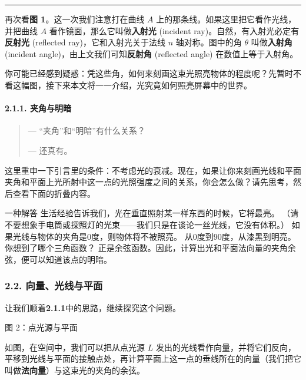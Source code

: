 \documentclass[
]{article}
\begin{document}
\begin{center}\rule{0.5\linewidth}{0.5pt}\end{center}

再次看\textbf{图 1}。这一次我们注意打在曲线 \(A\)
上的那条线。如果这里把它看作光线，并把曲线 \(A\)
看作镜面，那么它叫做\textbf{入射光} (incident
ray)。自然，有入射光必定有\textbf{反射光} (reflected
ray)，它和入射光关于法线 \(n\) 轴对称。图中的角 \(\theta\)
叫做\textbf{入射角} (incident angle)，由上文我们可知\textbf{反射角}
(reflected angle) 在数值上等于入射角。

你可能已经感到疑惑：凭这些角，如何来刻画这束光照亮物体的程度呢？先暂时不看这幅图，接下来本文将一一介绍，光究竟如何照亮屏幕中的世界。

\hypertarget{211-ux5939ux89d2ux4e0eux660eux6697}{%
\paragraph{2.1.1. 夹角与明暗}\label{211-ux5939ux89d2ux4e0eux660eux6697}}

\begin{quote}
--- ``夹角''和``明暗''有什么关系？

--- 还真有。
\end{quote}

这里重申一下引言里的条件：不考虑光的衰减。现在，如果让你来刻画光线和平面夹角和平面上光所射中这一点的光照强度之间的关系，你会怎么做？请先思考，然后查看下面的折叠内容。

 一种解答 生活经验告诉我们，光在垂直照射某一样东西的时候，它将最亮。
（请不要想象手电筒或探照灯的光束------我们只是在谈论一丝光线，它没有体积。）
如果光线与物体的夹角是0度，则物体将不被照亮。
从0度到90度，从漆黑到明亮。你想到了哪个三角函数？
正是余弦函数。因此，计算出光和平面法向量的夹角余弦，便可以知道该点的明暗。
 

\hypertarget{22-ux5411ux91cfux5149ux7ebfux4e0eux5e73ux9762}{%
\subsubsection{2.2.
向量、光线与平面}\label{22-ux5411ux91cfux5149ux7ebfux4e0eux5e73ux9762}}

让我们顺着\textbf{2.1.1}中的思路，继续探究这个问题。

  

 图 2：点光源与平面 

如图，在空间中，我们可以把从点光源 \(L\)
发出的光线看作向量，并将它们反向，平移到光线与平面的接触点处，再计算平面上这一点的垂线所在的向量（我们把它叫做\textbf{法向量}）与这束光的夹角的余弦。
\end{document}
